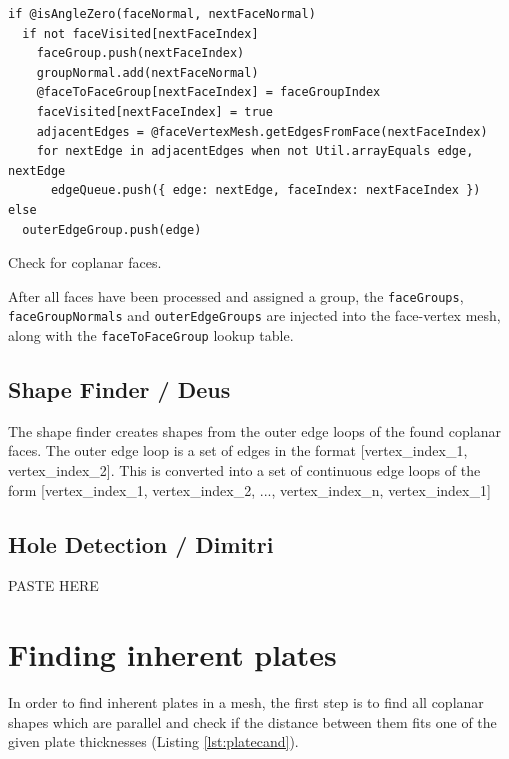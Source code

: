 \documentclass[../ClassicThesis.tex]{subfiles}
\begin{document}
\begin{listing}
\begin{verbatim}
if @isAngleZero(faceNormal, nextFaceNormal)
  if not faceVisited[nextFaceIndex]
    faceGroup.push(nextFaceIndex)
    groupNormal.add(nextFaceNormal)
    @faceToFaceGroup[nextFaceIndex] = faceGroupIndex
    faceVisited[nextFaceIndex] = true
    adjacentEdges = @faceVertexMesh.getEdgesFromFace(nextFaceIndex)
    for nextEdge in adjacentEdges when not Util.arrayEquals edge, nextEdge
      edgeQueue.push({ edge: nextEdge, faceIndex: nextFaceIndex })
else
  outerEdgeGroup.push(edge)
\end{verbatim}
\caption{Check for coplanar faces.}
\label{lst:coplanarcheck}
\end{listing}

After all faces have been processed and assigned a group, the \texttt{faceGroups}, \texttt{faceGroupNormals} and \texttt{outerEdgeGroups} are injected into the face-vertex mesh, along with the \texttt{faceToFaceGroup} lookup table.

\subsection{Shape Finder / Deus}


The shape finder creates shapes from the outer edge loops of the found coplanar faces. The outer edge loop is a set of edges in the format [vertex_index_1, vertex_index_2]. This is converted into a set of continuous edge loops of the form [vertex_index_1, vertex_index_2, ..., vertex_index_n, vertex_index_1]

\subsection{Hole Detection / Dimitri}

PASTE HERE

\section{Finding inherent plates}\label{sec:inherentplates}

In order to find inherent plates in a mesh, the first step is to find all coplanar shapes which are parallel and check if the distance between them fits one of the given plate thicknesses (Listing \ref{lst:platecand}).
\end{document}

